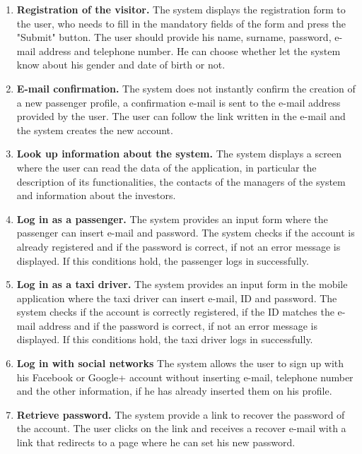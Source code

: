 \documentclass[18pt,oneside,a4paper, titlepage]{article}
\begin{document}
		\begin{enumerate}
			\item \textbf{Registration of the visitor.}
				The system displays the registration form to the user, who needs to fill in the mandatory fields of the form and press the "Submit" button. The user should provide his name, surname, password, e-mail address and telephone number. He can choose whether let the system know about his gender and date of birth or not.
			
			\item \textbf{E-mail confirmation.}
				The system does not instantly confirm the creation of a new passenger profile, a confirmation e-mail is sent to the e-mail address provided by the user. The user can follow the link written in the e-mail and the system creates the new account.
				
			\item \textbf{Look up information about the system.}
				The system displays a screen where the user can read the data of the application, in particular the description of its functionalities, the contacts of the managers of the system and information about the investors.
				
			\item \textbf{Log in as a passenger.}
				The system provides an input form where the passenger can insert e-mail and password. The system checks if the account is already registered and if the password is correct, if not an error message is displayed. If this conditions hold, the passenger logs in successfully.
				
			\item \textbf{Log in as a taxi driver.}
				The system provides an input form in the mobile application where the taxi driver can insert e-mail, ID and password. The system checks if the account is correctly registered, if the ID matches the e-mail address and if the password is correct, if not an error message is displayed. If this conditions hold, the taxi driver logs in successfully.
				
			\item \textbf{Log in with social networks}
				The system allows the user to sign up with his Facebook or Google+ account without inserting e-mail, telephone number and the other information, if he has already inserted them on his profile.
				
			\item \textbf{Retrieve password.}
				The system provide a link to recover the password of the account. The user clicks on the link and receives a recover e-mail with a link that redirects to a page where he can set his new password.
				

\end{enumerate}
\end{document}
